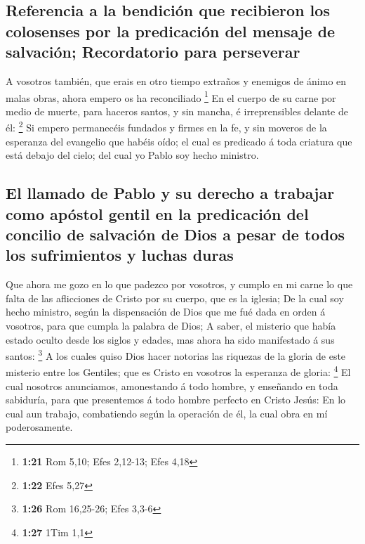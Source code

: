 \hypertarget{referencia-a-la-bendiciuxf3n-que-recibieron-los-colosenses-por-la-predicaciuxf3n-del-mensaje-de-salvaciuxf3n-recordatorio-para-perseverar}{%
\subsection{Referencia a la bendición que recibieron los colosenses por
la predicación del mensaje de salvación; Recordatorio para
perseverar}\label{referencia-a-la-bendiciuxf3n-que-recibieron-los-colosenses-por-la-predicaciuxf3n-del-mensaje-de-salvaciuxf3n-recordatorio-para-perseverar}}

 A vosotros también, que erais en otro tiempo extraños y
enemigos de ánimo en malas obras, ahora empero os ha reconciliado
\footnote{\textbf{1:21} Rom 5,10; Efes 2,12-13; Efes 4,18}
 En el cuerpo de su carne por medio de muerte, para
haceros santos, y sin mancha, é irreprensibles delante de él:
\footnote{\textbf{1:22} Efes 5,27}  Si empero permanecéis
fundados y firmes en la fe, y sin moveros de la esperanza del evangelio
que habéis oído; el cual es predicado á toda criatura que está debajo
del cielo; del cual yo Pablo soy hecho ministro.

\hypertarget{el-llamado-de-pablo-y-su-derecho-a-trabajar-como-apuxf3stol-gentil-en-la-predicaciuxf3n-del-concilio-de-salvaciuxf3n-de-dios-a-pesar-de-todos-los-sufrimientos-y-luchas-duras}{%
\subsection{El llamado de Pablo y su derecho a trabajar como apóstol
gentil en la predicación del concilio de salvación de Dios a pesar de
todos los sufrimientos y luchas
duras}\label{el-llamado-de-pablo-y-su-derecho-a-trabajar-como-apuxf3stol-gentil-en-la-predicaciuxf3n-del-concilio-de-salvaciuxf3n-de-dios-a-pesar-de-todos-los-sufrimientos-y-luchas-duras}}

 Que ahora me gozo en lo que padezco por vosotros, y
cumplo en mi carne lo que falta de las aflicciones de Cristo por su
cuerpo, que es la iglesia;  De la cual soy hecho
ministro, según la dispensación de Dios que me fué dada en orden á
vosotros, para que cumpla la palabra de Dios;  A saber,
el misterio que había estado oculto desde los siglos y edades, mas ahora
ha sido manifestado á sus santos: \footnote{\textbf{1:26} Rom 16,25-26;
  Efes 3,3-6}  A los cuales quiso Dios hacer notorias las
riquezas de la gloria de este misterio entre los Gentiles; que es Cristo
en vosotros la esperanza de gloria: \footnote{\textbf{1:27} 1Tim 1,1}
 El cual nosotros anunciamos, amonestando á todo hombre,
y enseñando en toda sabiduría, para que presentemos á todo hombre
perfecto en Cristo Jesús:  En lo cual aun trabajo,
combatiendo según la operación de él, la cual obra en mí poderosamente.

